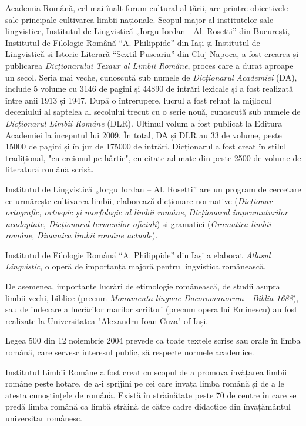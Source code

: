 \documentclass[]{../../metanetpaper}
\begin{document}
\begin{multicols}{2}
Academia Română, cel mai înalt forum cultural al țării, are printre obiectivele sale principale cultivarea limbii naționale. Scopul major al institutelor sale lingvistice, Institutul de Lingvistică „Iorgu Iordan - Al. Rosetti” din București, Institutul de Filologie Română “A. Philippide” din Iași și Institutul de Lingvistică și Istorie Literară “Sextil Pușcariu” din Cluj-Napoca, a fost crearea și publicarea \textit{Dicționarului Tezaur al Limbii Române}, proces care a durat aproape un secol. Seria mai veche, cunoscută sub numele de \textit{Dicționarul Academiei} (DA), include 5 volume cu 3146 de pagini și 44890 de intrări lexicale și a fost realizată între anii 1913 și 1947. După o întrerupere, lucrul a fost reluat la mijlocul deceniului al șaptelea al secolului trecut cu o serie nouă, cunoscută sub numele de \textit{Dicționarul Limbii Române} (DLR). Ultimul volum a fost publicat la Editura Academiei la începutul lui 2009. În total, DA și DLR au 33 de volume, peste 15000 de pagini și în jur de 175000 de intrări. Dicționarul a fost creat în stilul tradițional, "cu creionul pe hârtie", cu citate adunate din peste 2500 de volume de literatură română scrisă.

Institutul de Lingvistică „Iorgu Iordan – Al. Rosetti” are un program de cercetare ce urmărește cultivarea limbii, elaborează dicționare normative (\textit{Dicționar ortografic, ortoepic și morfologic al limbii române}, \textit{Dicționarul împrumuturilor neadaptate}, \textit{Dicționarul termenilor oficiali}) și gramatici (\textit{Gramatica limbii române}, \textit{Dinamica limbii române actuale}).

Institutul de Filologie Română “A. Philippide” din Iași a elaborat \textit{Atlasul Lingvistic}, o operă de importanță majoră pentru lingvistica românească.

De asemenea, importante lucrări de etimologie românească, de studii asupra limbii vechi, biblice (precum \textit{Monumenta linguae Dacoromanorum - Biblia 1688}), sau de indexare a lucrărilor marilor scriitori (precum opera lui Eminescu) au fost realizate la Universitatea "Alexandru Ioan Cuza" of Iași. 

Legea 500 din 12 noiembrie 2004 prevede ca toate textele scrise sau orale în limba română, care servesc interesul public, să respecte normele academice.


Institutul Limbii Române a fost creat cu scopul de a promova învățarea limbii române peste hotare, de a-i sprijini pe cei care învață limba română și de a le atesta cunoștințele de română\cite{urlILR}. Există în străinătate peste 70 de centre în care se predă limba română ca limbă străină de către cadre didactice din învățământul universitar românesc.


\end{multicols}
\end{document}
